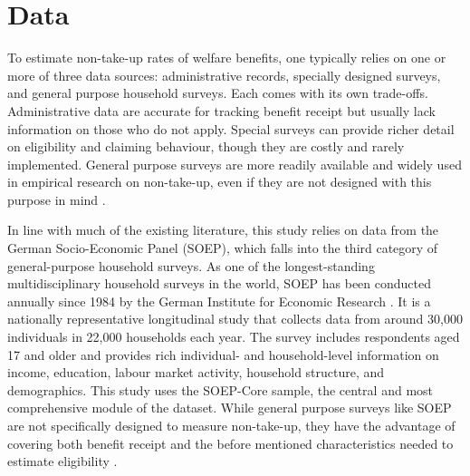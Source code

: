 %
%




\section{Data}
To estimate non-take-up rates of welfare benefits, one typically relies on one or more of three data sources: administrative records, specially designed surveys, and general purpose household surveys.
Each comes with its own trade-offs. 
Administrative data are accurate for tracking benefit receipt but usually lack information on those who do not apply. 
Special surveys can provide richer detail on eligibility and claiming behaviour, though they are costly and rarely implemented. 
General purpose surveys are more readily available and widely used in empirical research on non-take-up, even if they are not designed with this purpose in mind \citep{mechelen_who_2017}.

In line with much of the existing literature, this study relies on data from the German Socio-Economic Panel (SOEP), which falls into the third category of general-purpose household surveys. 
As one of the longest-standing multidisciplinary household surveys in the world, SOEP has been conducted annually since 1984 by the German Institute for Economic Research \citep{soepcore_v39}. 
It is a nationally representative longitudinal study that collects data from around 30,000 individuals in 22,000 households each year. 
The survey includes respondents aged 17 and older and provides rich individual- and household-level information on income, education, labour market activity, household structure, and demographics. 
This study uses the SOEP-Core sample, the central and most comprehensive module of the dataset. While general purpose surveys like SOEP are not specifically designed to measure non-take-up, they have the advantage of covering both benefit receipt and the before mentioned characteristics needed to estimate eligibility \citep{mechelen_who_2017}.

